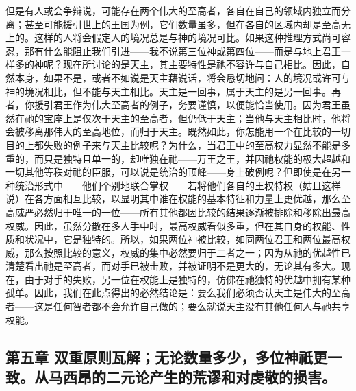 但是有人或会争辩说，可能存在两个伟大的至高者，各自在自己的领域内独立而分离；甚至可能援引世上的王国为例，它们数量虽多，但在各自的区域内却是至高无上的。这样的人将会假定人的境况总是与神的境况可比。如果这种推理方式尚可容忍，那有什么能阻止我们引进——我不说第三位神或第四位——而是与地上君王一样多的神呢？现在所讨论的是天主，其主要特性是祂不容许与自己相比。因此，自然本身，如果不是，或者不如说是天主藉说话，将会恳切地问：人的境况或许可与神的境况相比，但不能与天主相比。天主是一回事，属于天主的是另一回事。再者，你援引君王作为伟大至高者的例子，务要谨慎，以便能恰当使用。因为君王虽然在祂的宝座上是仅次于天主的至高者，但仍低于天主；当他与天主相比时，他将会被移离那伟大的至高地位，而归于天主。既然如此，你怎能用一个在比较的一切目的上都失败的例子来与天主比较呢？为什么，当君王中的至高权力显然不能是多重的，而只是独特且单一的，却唯独在祂——万王之王，并因祂权能的极大超越和一切其他等秩对祂的臣服，可以说是统治的顶峰——身上破例呢？但即使是在另一种统治形式中——他们个别地联合掌权——若将他们各自的王权特权（姑且这样说）在各方面相互比较，以显明其中谁在权能的基本特征和力量上更优越，那么至高威严必然归于唯一的一位——所有其他都因比较的结果逐渐被排除和移除出最高权威。因此，虽然分散在多人手中时，最高权威看似多重，但在其自身的权能、性质和状况中，它是独特的。所以，如果两位神被比较，如同两位君王和两位最高权威，那么按照比较的意义，权威的集中必然要归于二者之一；因为从祂的优越性已清楚看出祂是至高者，而对手已被击败，并被证明不是更大的，无论其有多大。现在，由于对手的失败，另一位在权能上是独特的，仿佛在祂独特的优越中拥有某种孤单。因此，我们在此点得出的必然结论是：要么我们必须否认天主是伟大的至高者——这是任何智者都不会允许自己做的；要么就说天主没有其他任何人与祂共享权能。\par


\subsection{第五章 双重原则瓦解；无论数量多少，多位神祇更一致。从马西昂的二元论产生的荒谬和对虔敬的损害。}

